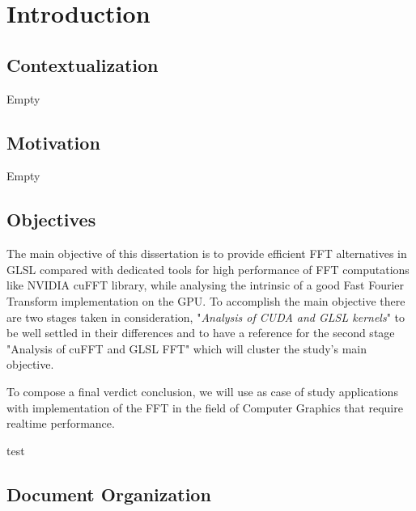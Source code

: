\documentclass[
  oneside,
  11pt, a4paper,
  footinclude=true,
  headinclude=true,
  cleardoublepage=empty
]{scrbook}
\begin{document}
    
    
    
    \cleardoublepage
    \setcounter{page}{5}


\chapter{Introduction}

\section{Contextualization}

Empty

\section{Motivation}

Empty

\section{Objectives}

The main objective of this dissertation is to provide efficient FFT alternatives in GLSL compared with dedicated tools for high performance of FFT computations like NVIDIA cuFFT library, while analysing the intrinsic of a good Fast Fourier Transform implementation on the GPU.
To accomplish the main objective there are two stages taken in consideration, "\textit{Analysis of CUDA and GLSL kernels}" to be well settled in their differences and to have a reference for the second stage "Analysis of cuFFT and GLSL FFT" which will cluster the study's main objective.

To compose a final verdict conclusion, we will use as case of study applications with implementation of the FFT in the field of Computer Graphics that require realtime performance.

test \cite{brigham1988fast}

\section{Document Organization}
\end{document}
